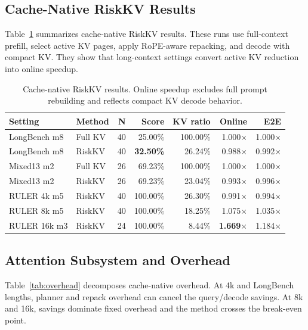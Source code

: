 \documentclass{article}
\begin{document}
\subsection{Cache-Native RiskKV Results}

Table~\ref{tab:cache-main} summarizes cache-native RiskKV results.
These runs use full-context prefill, select active KV pages, apply RoPE-aware repacking, and decode with compact KV.
They show that long-context settings convert active KV reduction into online speedup.

\begin{table}[t]
\centering
\caption{Cache-native RiskKV results. Online speedup excludes full prompt rebuilding and reflects compact KV decode behavior.}
\label{tab:cache-main}
\begin{tabular}{llrrrrr}
\toprule
Setting & Method & N & Score & KV ratio & Online & E2E \\
\midrule
LongBench m8 & Full KV & 40 & 25.00\% & 100.00\% & 1.000$\times$ & 1.000$\times$ \\
LongBench m8 & RiskKV & 40 & \textbf{32.50\%} & 26.24\% & 0.988$\times$ & 0.992$\times$ \\
Mixed13 m2 & Full KV & 26 & 69.23\% & 100.00\% & 1.000$\times$ & 1.000$\times$ \\
Mixed13 m2 & RiskKV & 26 & 69.23\% & 23.04\% & 0.993$\times$ & 0.996$\times$ \\
RULER 4k m5 & RiskKV & 40 & 100.00\% & 26.30\% & 0.991$\times$ & 0.994$\times$ \\
RULER 8k m5 & RiskKV & 40 & 100.00\% & 18.25\% & 1.075$\times$ & 1.035$\times$ \\
RULER 16k m3 & RiskKV & 24 & 100.00\% & 8.44\% & \textbf{1.669}$\times$ & 1.184$\times$ \\
\bottomrule
\end{tabular}
\end{table}

\subsection{Attention Subsystem and Overhead}

Table~\ref{tab:overhead} decomposes cache-native overhead.
At 4k and LongBench lengths, planner and repack overhead can cancel the query/decode savings.
At 8k and 16k, savings dominate fixed overhead and the method crosses the break-even point.
\end{document}
